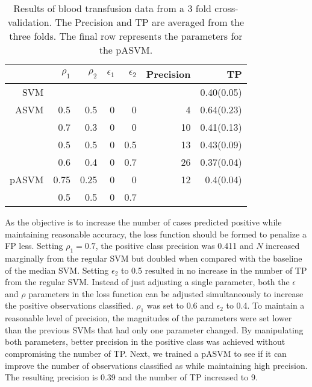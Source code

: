 \documentclass[twoside,11pt]{article}
\begin{document}
\begin{table}[htp]
\centering
\small\begin{tabular}{rrrrr|rr}
\hline
&$\rho_1$ & $\rho_2$ & $\epsilon_1$ & $\epsilon_2$ & Precision & TP \bigstrut\\
\hline
\hline
SVM &       &       &       &       &       & 0.40(0.05) \bigstrut[t]\\
ASVM  & 0.5   & 0.5   & 0     & 0     & 4     & 0.64(0.23) \\
      & 0.7   & 0.3   & 0     & 0     & 10    & 0.41(0.13) \\
      & 0.5   & 0.5   & 0     & 0.5   & 13    & 0.43(0.09) \\
      & 0.6   & 0.4   & 0     & 0.7   & 26    & 0.37(0.04) \bigstrut[b]\\
\hline
pASVM & 0.75  & 0.25  & 0     & 0     & 12    & 0.4(0.04) \bigstrut[t]\\
      & 0.5   & 0.5   & 0     & 0.7   &       &  \bigstrut[b]\\
\hline
\hline
\end{tabular}%
\caption{Results of blood transfusion data from a 3 fold cross-validation. The Precision and TP are averaged from the three folds. The final row represents the parameters for the pASVM.}
\label{bloodtransfusion}
\end{table}

As the objective is to increase the number of cases predicted positive while maintaining reasonable accuracy, the loss function should be formed to penalize a FP less. Setting $\rho_1=0.7$, the positive class precision was 0.411 and $N$ increased marginally from the regular SVM but doubled when compared with the baseline of the median SVM. Setting $\epsilon_2$ to 0.5 resulted in no increase in the number of TP from the regular SVM. Instead of just adjusting a single parameter, both the $\epsilon$ and $\rho$ parameters in the loss function can be adjusted simultaneously to increase the positive observations classified. $\rho_1$ was set to 0.6 and $\epsilon_2$ to 0.4. To maintain a reasonable level of precision, the magnitudes of the parameters were set lower than the previous SVMs that had only one parameter changed. By manipulating both parameters, better precision in the positive class was achieved without compromising the number of TP. Next, we trained a pASVM to see if it can improve the number of observations classified as while maintaining high precision. The resulting precision is 0.39 and the number of TP increased to 9.
\end{document}
